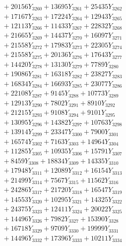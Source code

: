\documentclass[a4paper,10pt]{article}
\begin{document}
{\begin{align}
&\;  + 20156 Y_{3260} + 13695 Y_{3261} + 25435 Y_{3262} \\[0.3ex]
&\;  + 17167 Y_{3263} + 17224 Y_{3264} + 12943 Y_{3265} \\[0.3ex]
&\;  + 12113 Y_{3266} + 11433 Y_{3267} + 22832 Y_{3268} \\[0.5ex]\allowbreak
&\;  + 21665 Y_{3269} + 14437 Y_{3270} + 16097 Y_{3271} \\[0.3ex]
&\;  + 21558 Y_{3272} + 17983 Y_{3273} + 22305 Y_{3274} \\[0.3ex]
&\;  + 21558 Y_{3275} + 20136 Y_{3276} + 17643 Y_{3277} \\[0.3ex]
&\;  + 14420 Y_{3278} + 13130 Y_{3279} + 7789 Y_{3280} \\[0.3ex]
&\;  + 19086 Y_{3281} + 16318 Y_{3282} + 23827 Y_{3283} \\[0.3ex]
&\;  + 16834 Y_{3284} + 16693 Y_{3285} + 23077 Y_{3286} \\[0.3ex]
&\;  + 22108 Y_{3287} + 9145 Y_{3288} + 10773 Y_{3289} \\[0.3ex]
&\;  + 12913 Y_{3290} + 7802 Y_{3291} + 8910 Y_{3292} \\[0.3ex]
&\;  + 21215 Y_{3293} + 9108 Y_{3294} + 9101 Y_{3295} \\[0.3ex]
&\;  + 13095 Y_{3296} + 14382 Y_{3297} + 10763 Y_{3298} \\[0.5ex]\allowbreak
&\;  + 13914 Y_{3299} + 23347 Y_{3300} + 7900 Y_{3301} \\[0.3ex]
&\;  + 16574 Y_{3302} + 7163 Y_{3303} + 14964 Y_{3304} \\[0.3ex]
&\;  + 11285 Y_{3305} + 10935 Y_{3306} + 15791 Y_{3307} \\[0.3ex]
&\;  + 8459 Y_{3308} + 18834 Y_{3309} + 14335 Y_{3310} \\[0.3ex]
&\;  + 17948 Y_{3311} + 12089 Y_{3312} + 16154 Y_{3313} \\[0.3ex]
&\;  + 21499 Y_{3314} + 7567 Y_{3315} + 11562 Y_{3316} \\[0.3ex]
&\;  + 24286 Y_{3317} + 21720 Y_{3318} + 16547 Y_{3319} \\[0.3ex]
&\;  + 14553 Y_{3320} + 10295 Y_{3321} + 14325 Y_{3322} \\[0.3ex]
&\;  + 24375 Y_{3323} + 12411 Y_{3324} + 20022 Y_{3325} \\[0.3ex]
&\;  + 14496 Y_{3326} + 7982 Y_{3327} + 15390 Y_{3328} \\[0.5ex]\allowbreak
&\;  + 16718 Y_{3329} + 9709 Y_{3330} + 19999 Y_{3331} \\[0.3ex]
&\;  + 14496 Y_{3332} + 17396 Y_{3333} + 10211 Y_{3334} \\[0.3ex]

\end{align}}
\end{document}
